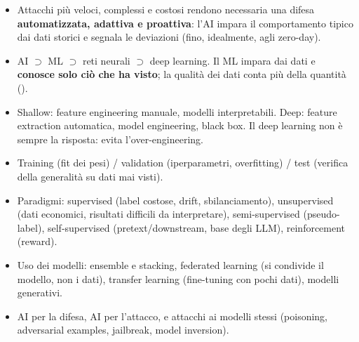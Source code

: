 \begin{sintesi}
\begin{itemize}
  \item Attacchi più veloci, complessi e costosi rendono necessaria una difesa \textbf{automatizzata, adattiva e proattiva}: l'AI
        impara il comportamento tipico dai dati storici e segnala le deviazioni (fino, idealmente, agli zero-day).
  \item AI $\supset$ ML $\supset$ reti neurali $\supset$ deep learning. Il ML impara dai dati e \textbf{conosce solo ciò che ha visto};
        la qualità dei dati conta più della quantità ().
  \item Shallow: feature engineering manuale, modelli interpretabili. Deep: feature extraction automatica, model engineering,
        black box. Il deep learning non è sempre la risposta: evita l'over-engineering.
  \item Training (fit dei pesi) / validation (iperparametri, overfitting) / test (verifica della generalità su dati mai visti).
  \item Paradigmi: supervised (label costose, drift, sbilanciamento), unsupervised (dati economici, risultati difficili da
        interpretare), semi-supervised (pseudo-label), self-supervised (pretext/downstream, base degli LLM), reinforcement (reward).
  \item Uso dei modelli: ensemble e stacking, federated learning (si condivide il modello, non i dati), transfer learning
        (fine-tuning con pochi dati), modelli generativi.
  \item AI per la difesa, AI per l'attacco, e attacchi ai modelli stessi (poisoning, adversarial examples, jailbreak, model inversion).
\end{itemize}
\end{sintesi}
